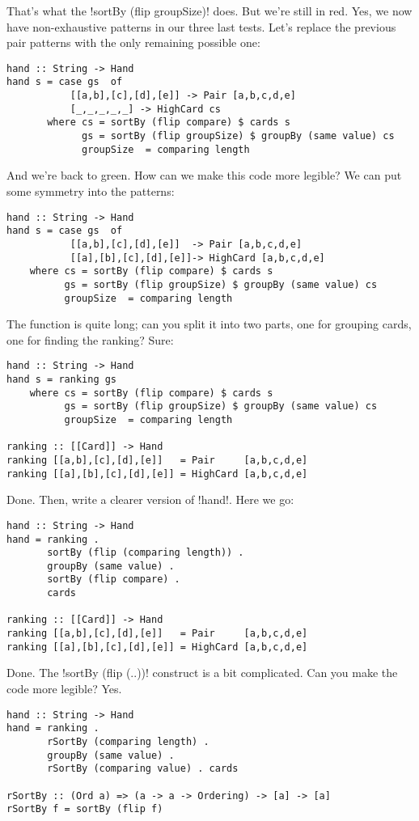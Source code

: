\failure That's what the \il!sortBy (flip groupSize)! does. But we're still in red.
\lhN Yes, we now have non-exhaustive patterns in our three last tests.
\lhA \failure Let's replace the previous pair patterns with the only remaining possible one:
\begin{lstlisting}[frame=single]
hand :: String -> Hand
hand s = case gs  of
           [[a,b],[c],[d],[e]] -> Pair [a,b,c,d,e]
           [_,_,_,_,_] -> HighCard cs 
       where cs = sortBy (flip compare) $ cards s
             gs = sortBy (flip groupSize) $ groupBy (same value) cs
             groupSize  = comparing length 
\end{lstlisting}
\success And we're back to green.
\lhN How can we make this code more legible?
\lhA We can put some symmetry into the patterns:
\begin{lstlisting}[frame=single]
hand :: String -> Hand
hand s = case gs  of
           [[a,b],[c],[d],[e]]  -> Pair [a,b,c,d,e]
           [[a],[b],[c],[d],[e]]-> HighCard [a,b,c,d,e] 
    where cs = sortBy (flip compare) $ cards s
          gs = sortBy (flip groupSize) $ groupBy (same value) cs
          groupSize  = comparing length 
\end{lstlisting}
\lhN The function is quite long; can you split it into two parts, one for grouping cards, one for finding the ranking?
\lhA \success Sure:
\begin{lstlisting}[frame=single]
hand :: String -> Hand
hand s = ranking gs
    where cs = sortBy (flip compare) $ cards s
          gs = sortBy (flip groupSize) $ groupBy (same value) cs
          groupSize  = comparing length 

ranking :: [[Card]] -> Hand
ranking [[a,b],[c],[d],[e]]   = Pair     [a,b,c,d,e]
ranking [[a],[b],[c],[d],[e]] = HighCard [a,b,c,d,e] 
\end{lstlisting}
\success Done.
\lhN Then, write a clearer version of \il!hand!.
\lhA Here we go:
\begin{lstlisting}[frame=single]
hand :: String -> Hand
hand = ranking .
       sortBy (flip (comparing length)) .
       groupBy (same value) .
       sortBy (flip compare) .
       cards

ranking :: [[Card]] -> Hand
ranking [[a,b],[c],[d],[e]]   = Pair     [a,b,c,d,e]
ranking [[a],[b],[c],[d],[e]] = HighCard [a,b,c,d,e] 
\end{lstlisting}
\success Done.
\lhN The \il!sortBy (flip (..))! construct is a bit complicated. Can you make the code more legible?
\lhA Yes. 
\begin{lstlisting}[frame=single]
hand :: String -> Hand
hand = ranking . 
       rSortBy (comparing length) .
       groupBy (same value) . 
       rSortBy (comparing value) . cards

rSortBy :: (Ord a) => (a -> a -> Ordering) -> [a] -> [a]
rSortBy f = sortBy (flip f)
\end{lstlisting}
